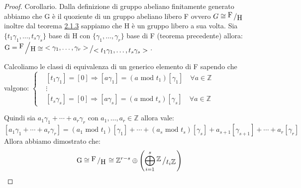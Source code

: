 \documentclass[11pt, a4paper, twoside]{article}
\newcommand{\bigslant}[2]{{\raisebox{.2em}{$#1$}\left/\raisebox{-.2em}{$#2$}\right.}}
\begin{document}
\newpage

\begin{proof}{Corollario.}
	Dalla definizione di gruppo abeliano finitamente generato abbiamo che G è il quoziente di un gruppo abeliano libero F ovvero $G\cong \bigslant{\text{F}}{\text{H}}$ inoltre dal teorema \hyperref[sottogruppi]{2.1.3} sappiamo che H è un gruppo libero a sua volta. Sia $\{t_1\gamma_1,\dots,t_s\gamma_s\}$ base di H con $\{\gamma_1,\dots,\gamma_r\}$ base di F (teorema precedente) allora: $\text{G}=\bigslant{\text{F}}{\text{H}\cong \bigslant{<\gamma_1,\dots,\gamma_r>}{<t_1\gamma_1,\dots,t_s\gamma_s>}}$. 

	Calcoliamo le classi di equivalenza di un generico elemento di F sapendo che valgono:
	$\begin{cases}
		&[t_1\gamma_1]=[0]\Rightarrow [a\gamma_1]=(a \text{ mod } t_1)[\gamma_1] \quad \forall a\in \mathbb{Z}\\ 
		&\vdots\\
		&[t_s\gamma_s]=[0]\Rightarrow [a\gamma_s]=(a  \text{ mod } t_s)[\gamma_s] \quad \forall a\in \mathbb{Z}
	\end{cases}$
	
	Quindi sia $a_1\gamma_1+\cdots+a_r\gamma_r$ con $a_1,\dots,a_r\in\mathbb{Z}$ allora vale:
	\[
		[a_1\gamma_1+\cdots+a_r\gamma_r]=(a_1  \text{ mod } t_1)[\gamma_1]+\cdots+(a_s  \text{ mod } t_s)[\gamma_s] +a_{s+1}[\gamma_{s+1}]+\cdots+a_r[\gamma_r] 
	\]
	Allora abbiamo dimostrato che:
	\[
		\text{G}\cong\bigslant{\text{F}}{\text{H}}\cong \mathbb{Z}^{r-s} \oplus \left(\bigoplus\limits_{i=1}^s\bigslant{\mathbb{Z}}{t_i\mathbb{Z}}\right)
	\]
\end{proof}
\end{document}
